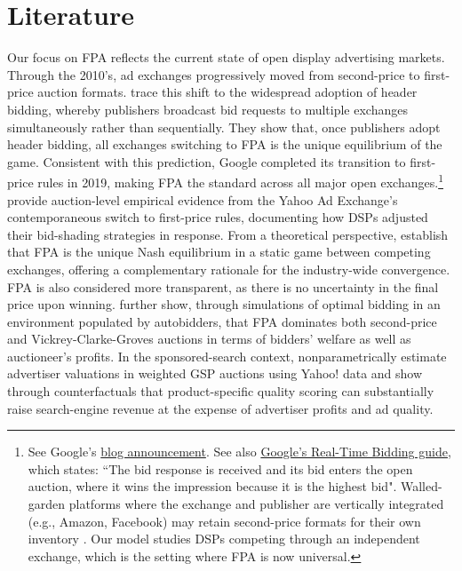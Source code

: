 \section{Literature}\label{sect:lit}
\noindent Our focus on FPA reflects the current state of open display advertising markets. Through the 2010's, ad exchanges progressively moved from second-price to first-price auction formats. \textcite{despotakisFirstPriceAuctionsOnline2021} trace this shift to the widespread adoption of header bidding, whereby publishers broadcast bid requests to multiple exchanges simultaneously rather than sequentially. They show that, once publishers adopt header bidding, all exchanges switching to FPA is the unique equilibrium of the game. Consistent with this prediction, Google completed its transition to first-price rules in 2019, making FPA the standard across all major open exchanges.\footnote{See Google's \href{https://blog.google/products/admanager/update-first-price-auctions-google-ad-manager/}{blog announcement}. See also \href{https://developers.google.com/authorized-buyers/rtb/start}{Google's Real-Time Bidding guide}, which states: ``The bid response is received and its bid enters the open auction, where it wins the impression because it is the highest bid". Walled-garden platforms where the exchange and publisher are vertically integrated (e.g., Amazon, Facebook) may retain second-price formats for their own inventory \parencite{choiOptimizingReservePrices2023}. Our model studies DSPs competing through an independent exchange, which is the setting where FPA is now universal.} \textcite{alcobendasSlimShadingAd2021} provide auction-level empirical evidence from the Yahoo Ad Exchange's contemporaneous switch to first-price rules, documenting how DSPs adjusted their bid-shading strategies in response. From a theoretical perspective, \textcite{lemeWhyCompetitiveMarkets2020} establish that FPA is the unique Nash equilibrium in a static game between competing exchanges, offering a complementary rationale for the industry-wide convergence. FPA is also considered more transparent, as there is no uncertainty in the final price upon winning. \textcite{dengNonuniformBidscalingEquilibria2024} further show, through simulations of optimal bidding in an environment populated by autobidders, that FPA dominates both second-price and Vickrey-Clarke-Groves auctions in terms of bidders' welfare as well as auctioneer's profits. In the sponsored-search context, \textcite{kimNonparametricEstimationSponsored2025} nonparametrically estimate advertiser valuations in weighted GSP auctions using Yahoo! data and show through counterfactuals that product-specific quality scoring can substantially raise search-engine revenue at the expense of advertiser profits and ad quality.\par

